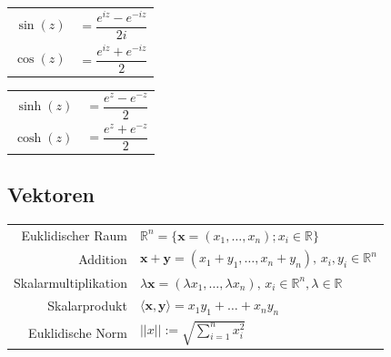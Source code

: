 \documentclass[a4paper, fontsize = 8pt, landscape]{scrartcl}
\newcommand{\vect}[1]{\mathbf{#1}}
\newcommand{\R}[0]{\mathbb{R}}
\begin{document}
\begin{multicols*}{3}
    \begin{center}
        \renewcommand{\arraystretch}{2.5}
        \begin{minipage}{0.47 \linewidth}
            \begin{center}
                \begin{tabular}{r l}
                    $\sin(z)$ & \hspace*{-10pt}$= \dfrac{e^{iz} - e^{-iz}}{2i}$ \\
                    $\cos(z)$ & \hspace*{-10pt}$= \dfrac{e^{iz} + e^{-iz}}{2}$  \\
                \end{tabular}
            \end{center}
        \end{minipage}
        \begin{minipage}{0.47 \linewidth}
            \begin{center}
                \begin{tabular}{r l}
                    $\sinh(z)$ & \hspace*{-10pt}$= \dfrac{e^{z} - e^{-z}}{2}$ \\
                    $\cosh(z)$ & \hspace*{-10pt}$= \dfrac{e^{z} + e^{-z}}{2}$ \\
                \end{tabular}
            \end{center}
        \end{minipage}
    \end{center}




    \subsection{Vektoren}

    \begin{center}
        \renewcommand{\arraystretch}{1.25}
        \begin{tabular}{r l} \toprule
            Euklidischer Raum    & $\R^n = \{\vect{x} = (x_1, \dots, x_n); x_i \in \R\}$                                   \\
            Addition             & $\vect{x} + \vect{y} = (x_1 + y_1, \dots, x_n + y_n), \, x_i, y_i \in \R^n$             \\
            Skalarmultiplikation & $\lambda \vect{x} = (\lambda x_1, \dots, \lambda x_n), \, x _i\in \R^n, \lambda \in \R$ \\
            Skalarprodukt        & $\langle \vect{x}, \vect{y} \rangle = x_1 y_1 + \dots + x_n y_n$                        \\
            Euklidische Norm     & $|| x || := \sqrt{\displaystyle\sum^n_{i = 1} x_i^2}$                                   \\ \bottomrule
        \end{tabular}
    \end{center}


\end{multicols*}
\end{document}
